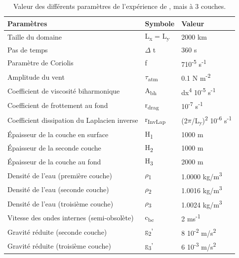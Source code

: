 \documentclass{article}
\numberwithin{equation}{section}
\begin{document}
\begin{table}[htbp]
\caption{\label{tab:orgd099e41}Valeur des différents paramètres de l'expérience de \cite{chen_2021}, mais à 3 couches.}
\centering
\begin{tabular}{lll}
\hline
\hline
Paramètres & Symbole & Valeur\\[0pt]
\hline
Taille du domaine & L\textsubscript{x} = L\textsubscript{y} & 2000 km\\[0pt]
Pas de temps & \(\Delta\) t & 360 s\\[0pt]
Paramètre de Coriolis & f & 7\texttimes{}10\textsuperscript{-5} s\textsuperscript{-1}\\[0pt]
Amplitude du vent & \(\tau\)\textsubscript{atm} & 0.1 N m\textsuperscript{-2}\\[0pt]
Coefficient de viscosité biharmonique & A\textsubscript{bh} & dx\textsuperscript{4} \texttimes{}10\textsuperscript{-5} s\textsuperscript{-1}\\[0pt]
Coefficient de frottement au fond & r\textsubscript{drag} & 10\textsuperscript{-7} s\textsuperscript{-1}\\[0pt]
Coefficient dissipation du Laplacien inverse & r\textsubscript{InvLap} & (2\(\pi\)/L\textsubscript{y})\textsuperscript{2} \texttimes{} 10\textsuperscript{-6} s\textsuperscript{-1}\\[0pt]
Épaisseur de la couche en surface & H\textsubscript{1} & 1000 m\\[0pt]
Épaisseur de la seconde couche & H\textsubscript{2} & 1000 m\\[0pt]
Épaisseur de la couche au fond & H\textsubscript{3} & 2000 m\\[0pt]
Densité de l'eau (première couche) & \(\rho\)\textsubscript{1} & 1.0000 kg/m\textsuperscript{3}\\[0pt]
Densité de l'eau (seconde couche) & \(\rho\)\textsubscript{2} & 1.0016 kg/m\textsuperscript{3}\\[0pt]
Densité de l'eau (troisième couche) & \(\rho\)\textsubscript{3} & 1.0024 kg/m\textsuperscript{3}\\[0pt]
Vitesse des ondes internes (semi-obsolète) & c\textsubscript{bc} & 2 ms\textsuperscript{-1}\\[0pt]
Gravité réduite (seconde couche) & g\textsubscript{2}' & 8 \texttimes{} 10\textsuperscript{-2} m/s\textsuperscript{2}\\[0pt]
Gravité réduite (troisième couche) & g\textsubscript{3}' & 6 \texttimes{} 10\textsuperscript{-3} m/s\textsuperscript{2}\\[0pt]
\hline
\hline
\end{tabular}
\end{table}
\end{document}
